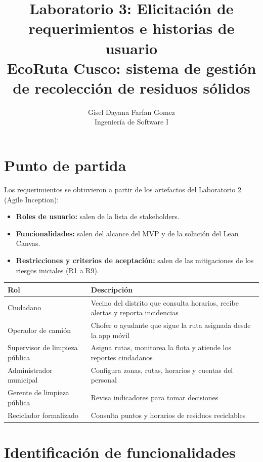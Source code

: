 \documentclass[11pt,a4paper]{article}
\title{\textbf{Laboratorio 3: Elicitación de requerimientos e historias de usuario}\\[0.4em]
\large EcoRuta Cusco: sistema de gestión de recolección de residuos sólidos}
\author{Gisel Dayana Farfan Gomez\\ Ingeniería de Software I}
\date{}
\begin{document}
\maketitle

\section{Punto de partida}

Los requerimientos se obtuvieron a partir de los artefactos del Laboratorio 2 (Agile Inception):

\begin{itemize}
  \item \textbf{Roles de usuario:} salen de la lista de stakeholders.
  \item \textbf{Funcionalidades:} salen del alcance del MVP y de la solución del Lean Canvas.
  \item \textbf{Restricciones y criterios de aceptación:} salen de las mitigaciones de los riesgos iniciales (R1 a R9).
\end{itemize}

\begin{center}
\begin{tabular}{L{4.6cm} L{11cm}}
\toprule
\textbf{Rol} & \textbf{Descripción} \\
\midrule
Ciudadano & Vecino del distrito que consulta horarios, recibe alertas y reporta incidencias \\
Operador de camión & Chofer o ayudante que sigue la ruta asignada desde la app móvil \\
Supervisor de limpieza pública & Asigna rutas, monitorea la flota y atiende los reportes ciudadanos \\
Administrador municipal & Configura zonas, rutas, horarios y cuentas del personal \\
Gerente de limpieza pública & Revisa indicadores para tomar decisiones \\
Reciclador formalizado & Consulta puntos y horarios de residuos reciclables \\
\bottomrule
\end{tabular}
\end{center}

\section{Identificación de funcionalidades}
\end{document}
